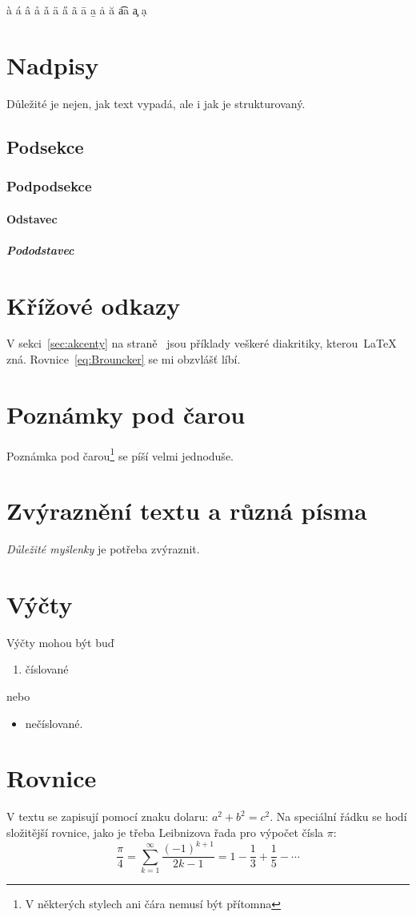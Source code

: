 \documentclass{article}
\begin{document}
	\`a \'a \^a \r a \v a \"a  \H a
	\~a \=a \b a \.a \u a \t{aa} \c a \d a
	
	\section{Nadpisy}
		Důležité je nejen, jak text vypadá, ale i jak je strukturovaný.
	\subsection{Podsekce}
	\subsubsection{Podpodsekce}
	\paragraph{Odstavec}
	\subparagraph{Pododstavec}	
	
	\section{Křížové odkazy}
	V sekci~\ref{sec:akcenty} na straně~\pageref{sec:akcenty} jsou příklady veškeré diakritiky, kterou~\LaTeX{} zná.
	Rovnice~\eqref{eq:Brouncker} se mi obzvlášť líbí.
	
	\section{Poznámky pod čarou}
	Poznámka pod čarou\footnote{V některých stylech ani čára nemusí být přítomna} se píší velmi jednoduše.
	
	\section{Zvýraznění textu a různá písma}
	\emph{Důležité myšlenky} je potřeba zvýraznit.
	
	\section{Výčty}
	Výčty mohou být buď
	\begin{enumerate}
		\item číslované
	\end{enumerate}
	nebo
	\begin{itemize}
		\item nečíslované.
	\end{itemize}
	
	\section{Rovnice}
	V textu se zapisují pomocí znaku dolaru: $a^2+b^2=c^2$.
	Na speciální řádku se hodí složitější rovnice, jako je třeba Leibnizova řada pro výpočet čísla $\pi$:
	\begin{equation}
		\frac{\pi}{4}=\sum_{k=1}^{\infty}\frac{(-1)^{k+1}}{2k-1}
			=1-\frac{1}{3}+\frac{1}{5}-\dotsb
	\end{equation}
	
\end{document}
